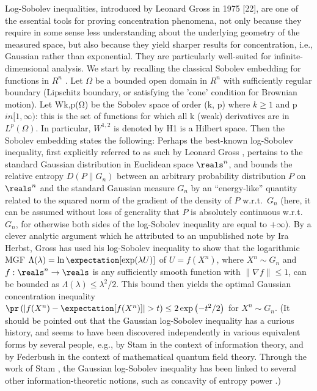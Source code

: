 \documentclass{article}
\theoremstyle{plain}
\begin{document}
Log-Sobolev inequalities, introduced by Leonard Gross in 1975 [22], are one of the
essential tools for proving concentration phenomena, not only because they require
in some sense less understanding about the underlying geometry of the measured
space, but also because they yield sharper results for concentration, i.e., Gaussian
rather than exponential. They are particularly well-suited for inﬁnite-dimensional
analysis.
We start by recalling the classical Sobolev embedding for functions in $R^{n}$
. Let
$\Omega$ be a bounded open domain in $R^n$ with sufficiently regular boundary (Lipschitz
boundary, or satisfying the ’cone’ condition for Brownian motion). Let Wk,p(Ω)
be the Sobolev space of order (k, p) where $k \geq  1$ and p $
in[1, \infty)$: this is the set
of functions for which all k (weak) derivatives are in $L^{p}
(\Omega)$. In particular, $W^{1,2}$
is denoted by H1
is a Hilbert space. Then the Sobolev embedding states the
following:
Perhaps the best-known log-Sobolev inequality, first explicitly referred to as such by Leonard Gross \cite{Gross}, pertains to the standard Gaussian distribution in Euclidean space $\reals^n$, and bounds the relative entropy $D(P \| G_n)$ between an arbitrary probability distribution $P$ on $\reals^n$ and the standard Gaussian measure $G_n$ by an ``energy-like'' quantity related to the squared norm of the gradient of the density of $P$ w.r.t.\ $G_n$ (here, it can be assumed without loss of generality that $P$ is absolutely continuous w.r.t.\ $G_n$, for otherwise both sides of the log-Sobolev inequality are equal to $+\infty$). By a clever analytic argument which he attributed to an unpublished note by Ira Herbst, Gross has used his log-Sobolev inequality to show that the logarithmic MGF $\Lambda(\lambda) = \ln \expectation[\exp(\lambda U)]$ of $U = f(X^n)$, where $X^n \sim G_n$ and $f : \reals^n \to \reals$ is any sufficiently smooth function with $\| \nabla f \| \le 1$, can be bounded as $\Lambda(\lambda) \le \lambda^2/2$. This bound then yields the optimal Gaussian concentration inequality $\pr\left(\left|f(X^n)-\expectation[f(X^n)]\right| > t\right) \le 2\exp\left(-t^2/2\right)$ for $X^n \sim G_n$. (It should be pointed out that the Gaussian log-Sobolev inequality has a curious history, and seems to have been discovered independently in various equivalent forms by several people, e.g., by Stam \cite{Stam} in the context of information theory, and by Federbush \cite{Federbush} in the context of mathematical quantum field theory. Through the work of Stam \cite{Stam}, the Gaussian log-Sobolev inequality has been linked to several other information-theoretic notions, such as concavity of entropy power \cite{Dembo_Cover_Thomas, Villani_EP_concavity,Toscani}.)
\end{document}
